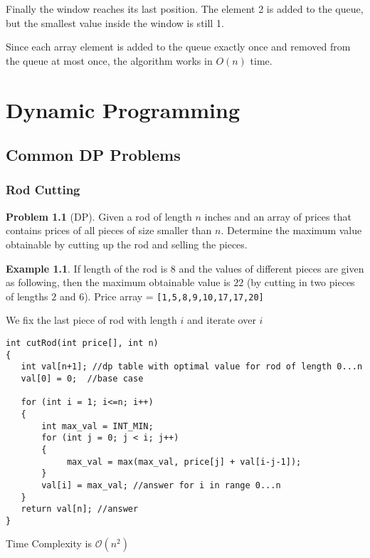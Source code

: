 \documentclass[twoside,12pt,a4paper,english]{book}
\theoremstyle{definition}
\newtheorem*{exmp}{Example}
\theoremstyle{problemstyle}
\newtheorem*{problem}{Problem} %
\theoremstyle{problemstyle}
\theoremstyle{problemstyle}
\begin{document}
Finally the window reaches its last position.
The element 2 is added to the queue,
but the smallest value inside the window
is still 1.
\begin{center}
\end{center}

Since each array element
is added to the queue exactly once and
removed from the queue at most once,
the algorithm works in $O(n)$ time.

\part{Dynamic Programming}
\chapter{Common DP Problems}
\section{Rod Cutting}
\begin{problem}[DP]
Given a rod of length $n$ inches and an array of prices that contains prices of all pieces of size smaller than $n$. Determine the maximum value obtainable by cutting up the rod and selling the pieces.
\end{problem}
\begin{exmp}
If length of the rod is $8$ and the values of different pieces are given as following, then the maximum obtainable value is $22$ (by cutting in two pieces of lengths $2$ and $6$).
Price  array = \texttt{[1,5,8,9,10,17,17,20]}
\end{exmp}
\begin{tcolorbox}[title=Solution]

We fix the last piece of rod with length $i$ and iterate over $i$
\begin{lstlisting}
int cutRod(int price[], int n)
{
   int val[n+1]; //dp table with optimal value for rod of length 0...n
   val[0] = 0;  //base case

   for (int i = 1; i<=n; i++)
   {
       int max_val = INT_MIN;
       for (int j = 0; j < i; j++)
       {
            max_val = max(max_val, price[j] + val[i-j-1]);
       }
       val[i] = max_val; //answer for i in range 0...n
   }
   return val[n]; //answer
}
\end{lstlisting}
Time Complexity is $\mathcal{O}(n^2)$
\end{tcolorbox}
\newpage
\end{document}
